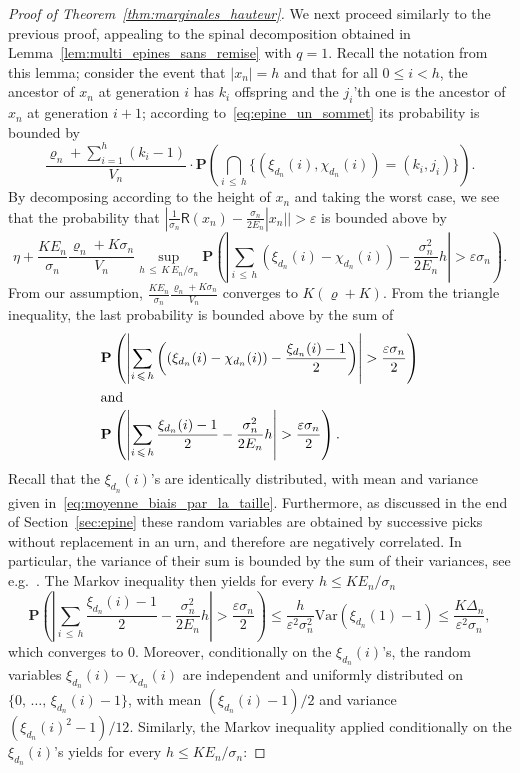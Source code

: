 \documentclass[AHL,Unicode,longabstracts,published]{cedram}
\newcommand{\ensembles}[1]{\mathbf{#1}}
\renewcommand{\P}{\ensembles{P}}
\renewcommand{\Pr}[1]{\P\left(#1\right)}
\newcommand{\1}{\ensembles{1}}
\renewcommand{\le}{\leqslant}
\newcommand{\RR}{\mathsf{R}}
\newcommand{\Var}{\mathrm{Var}}
\newcommand{\edges}{E}
\newcommand{\vertices}{V}
\begin{document}
\begin{proof}[Proof of Theorem~\ref{thm:marginales_hauteur}]
We next proceed similarly to the previous proof, appealing to the spinal decomposition obtained in Lemma~\ref{lem:multi_epines_sans_remise} with $q=1$. Recall the notation from this lemma; consider the event that $|x_n| = h$ and that for all $0 \le i < h$, the ancestor of $x_n$ at generation $i$ has $k_i$ offspring and the $j_i$'th one is the ancestor of $x_n$ at generation $i+1$; according to~\eqref{eq:epine_un_sommet} its probability is bounded by
\[
\frac{\varrho_n + \sum\limits_{i=1}^h (k_i - 1)}{\vertices_n}
\cdot \Pr{\bigcap_{i\,\le\,h} \big\{\left(\xi_{d_n}(i), \chi_{d_n}(i)\right) = \left(k_i, j_i\right)\big\}}.
\]
By decomposing according to the height of $x_n$ and taking the worst case, we see that the probability that $|\frac{1}{\sigma_n}\RR(x_n) - \frac{\sigma_n}{2 \edges_n}|x_n|| > \varepsilon$ is bounded above by
\[
\eta +
\frac{K \edges_n}{\sigma_n} \frac{\varrho_n + K \sigma_n}{\vertices_n} \sup_{h\,\le\,K\,\edges_n/\sigma_n}
\Pr{\left|\sum_{i\,\le\,h} \left(\xi_{d_n}(i) - \chi_{d_n}(i)\right) - \frac{\sigma_n^2}{2 \edges_n} h\right| > \varepsilon \sigma_n}.
\]
From our assumption, $\frac{K \edges_n}{\sigma_n} \frac{\varrho_n + K \sigma_n}{\vertices_n}$ converges to $K (\varrho + K)$. From the triangle inequality, the last probability is bounded above by the sum of
\begin{align*}
&\Pr{\left|\sum_{i\,\le\,h} \left(\left(\xi_{d_n}(i) - \chi_{d_n}(i)\right) - \frac{\xi_{d_n}(i) - 1}{2}\right)\right| > \frac{\varepsilon \sigma_n}{2}}
\\
\intertext{and}
&\Pr{\left|\sum_{i\,\le\,h} \frac{\xi_{d_n}(i) - 1}{2} - \frac{\sigma_n^2}{2 \edges_n} h\right| > \frac{\varepsilon \sigma_n}{2}}.
\end{align*}
Recall that the $\xi_{d_n}(i)$'s are identically distributed, with mean and variance given in~\eqref{eq:moyenne_biais_par_la_taille}. Furthermore, as discussed in the end of Section~\ref{sec:epine} these random variables are obtained by successive picks without replacement in an urn, and therefore are negatively correlated. In particular, the variance of their sum is bounded by the sum of their variances, see e.g.~\cite[Proposition~20.6]{Ald85}. The Markov inequality then yields for every $h \le K \edges_n / \sigma_n$
\[
\Pr{\left|\sum_{i\,\le\,h} \frac{\xi_{d_n}(i) - 1}{2} - \frac{\sigma_n^2}{2 \edges_n} h\right| > \frac{\varepsilon \sigma_n}{2}}
\le \frac{h}{\varepsilon^2 \sigma_n^2} \Var\left(\xi_{d_n}(1)-1\right)
\le \frac{K \Delta_n}{\varepsilon^2 \sigma_n},
\]
which converges to $0$. Moreover, conditionally on the $\xi_{d_n}(i)$'s, the random variables $\xi_{d_n}(i) - \chi_{d_n}(i)$ are independent and uniformly distributed on $\{0,\,\dots,\,\xi_{d_n}(i)-1\}$, with mean $(\xi_{d_n}(i) - 1)/2$ and variance $(\xi_{d_n}(i)^2 - 1)/12$. Similarly, the Markov inequality applied conditionally on the $\xi_{d_n}(i)$'s yields for every $h \le K \edges_n / \sigma_n$:


\end{proof}
\end{document}
